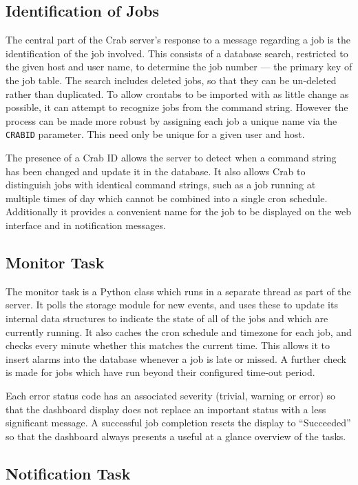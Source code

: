\subsection{Identification of Jobs}

The central part of the Crab server's response to a message
regarding a job is the identification of the job involved.
This consists of a database search, restricted to the
given host and user name, to determine the job number
--- the primary key of the job table.
The search includes deleted jobs, so that they can
be un-deleted rather than duplicated.
To allow crontabs to be imported with as little change as possible,
it can attempt to recognize jobs from the command string.
However the process can be made more robust by assigning each
job a unique name via the \texttt{CRABID} parameter.
This need only be unique for a given user and host.

The presence of a Crab ID allows the server to detect when a command string
has been changed and update it in the database.
It also allows Crab to distinguish jobs with identical command
strings, such as a job running at multiple times of
day which cannot be combined into a single cron schedule.
Additionally it provides a convenient name for the job
to be displayed on the web interface and in notification messages.

\subsection{Monitor Task}

The monitor task is a Python class which runs in a separate
thread as part of the server.
It polls
the storage module for new events, and
uses
these to update its internal data structures
to indicate
the state of all of the jobs
and which are currently running.
It also caches the cron schedule and timezone for each job,
and checks every minute whether this matches
the current time.
This allows it to insert alarms
into the database
whenever a job is late or missed.
A further check is made for jobs which
have run beyond their
configured time-out period.

Each error status code has an associated severity
(trivial, warning or error)
so that the dashboard display
does not replace an important status with a less significant message.
A successful job completion resets the
display to ``Succeeded'' so that the dashboard
always presents a useful at a glance overview
of the tasks.

\subsection{Notification Task}

